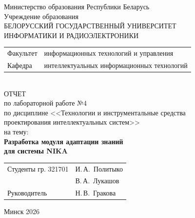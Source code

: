 \begin{titlepage}
	\begin{center}
		Министерство образования Республики Беларусь\\[1em]
		Учреждение образования\\
		БЕЛОРУССКИЙ ГОСУДАРСТВЕННЫЙ УНИВЕРСИТЕТ \\
		ИНФОРМАТИКИ И РАДИОЭЛЕКТРОНИКИ\\[1em]
		
		\begin{minipage}{\textwidth}
			\begin{flushleft}
				\begin{tabular}{ l l }
					Факультет & информационных технологий и управления\\
					Кафедра   & интеллектуальных информационных технологий
				\end{tabular}
			\end{flushleft}
		\end{minipage}\\[1em]
		
		{ОТЧЕТ}\\
		{по лабораторной работе №4}\\
		{по дисциплине <<Технологии и инструментальные средства}\\
		{проектирования интеллектуальных систем>>}\\
		{на тему:}\\[1em]
		\textbf{Разработка модуля адаптации знаний}\\
		\textbf{для системы NIKA}\\[1em]
		
		\vspace{2em}
		\begin{tabular}{ p{}p{} }
			Студенты гр. 321701 & И.\,А.~Политыко \\
			& В.\,А.~Лукашов \\
			Руководитель & Н.\,В.~Гракова \\
		\end{tabular}
		
		\vfill
		{\normalsize Минск 2026}
	\end{center}
\end{titlepage}
